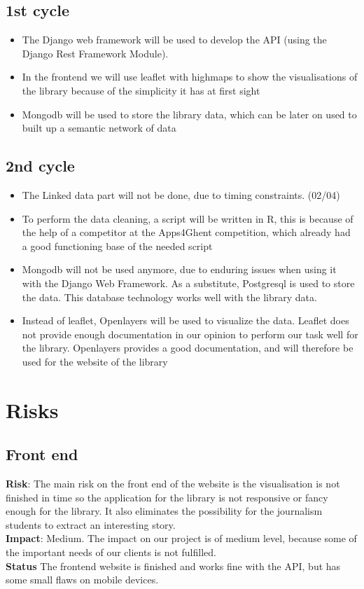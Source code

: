\subsection{1st cycle}
	\begin{itemize} 
		\item The Django web framework will be used to develop the API (using the Django Rest Framework Module).
   	 	\item In the frontend we will use leaflet with highmaps to show the visualisations of the library because of the simplicity it has at first sight
		\item Mongodb will be used to store the library data, which can be later on used to built up a semantic network of data
	\end{itemize}
\subsection{2nd cycle}
	\begin{itemize}
		\item The Linked data part will not be done, due to timing constraints. (02/04)
		\item To perform the data cleaning, a script will be written in R, this is because of the help of a competitor at the Apps4Ghent competition, which already had a good functioning base of the needed script
		\item Mongodb will not be used anymore, due to enduring issues when using it with the Django Web Framework. As a substitute, Postgresql is used to store the data. This database technology works well with the library data.
		\item Instead of leaflet, Openlayers will be used to visualize the data. Leaflet does not provide enough documentation in our opinion to perform our task well for the library. Openlayers provides a good documentation, and will therefore be used for the website of the library
	\end{itemize}
	

\section{Risks}

  \subsection{Front end}
	{\bf Risk}: The main risk on the front end of the website is the visualisation is not finished in time so the application for the library is not responsive or fancy enough for the library. It also eliminates the possibility for the journalism students to extract an interesting story.\\
	{\bf Impact}: Medium. The impact on our project is of medium level, because some of the important needs of our clients is not fulfilled.\\
	{\bf Status} The frontend website is finished and works fine with the API, but has some small flaws on mobile devices. 
